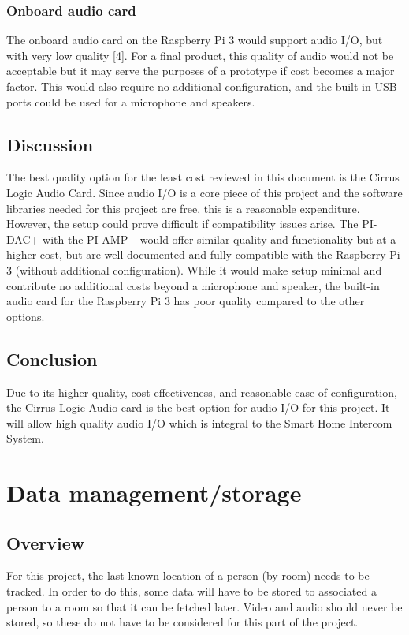 \documentclass[onecolumn, draftclsnofoot,10pt, compsoc]{IEEEtran}
\begin{document}
\subsubsection{Onboard audio card}
The onboard audio card on the Raspberry Pi 3 would support audio I/O, but with very low quality [4]. For a final product, this quality of audio would not be acceptable but it may serve the purposes of a prototype if cost becomes a major factor. This would also require no additional configuration, and the built in USB ports could be used for a microphone and speakers. 

\subsection{Discussion}
The best quality option for the least cost reviewed in this document is the Cirrus Logic Audio Card. Since audio I/O is a core piece of this project and the software libraries needed for this project are free, this is a reasonable expenditure. However, the setup could prove difficult if compatibility issues arise. The PI-DAC+ with the PI-AMP+ would offer similar quality and functionality but at a higher cost, but are well documented and fully compatible with the Raspberry Pi 3 (without additional configuration). While it would make setup minimal and contribute no additional costs beyond a microphone and speaker, the built-in audio card for the Raspberry Pi 3 has poor quality compared to the other options. 

\subsection{Conclusion}
Due to its higher quality, cost-effectiveness, and reasonable ease of configuration, the Cirrus Logic Audio card is the best option for audio I/O for this project. It will allow high quality audio I/O which is integral to the Smart Home Intercom System.




\section{Data management/storage}
\subsection{Overview}
For this project, the last known location of a person (by room) needs to be tracked. In order to do this, some data will have to be stored to associated a person to a room so that it can be fetched later. Video and audio should never be stored, so these do not have to be considered for this part of the project.
\end{document}
